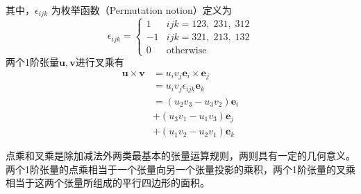 其中，$\epsilon_{ijk}$ 为枚举函数（Permutation notion）定义为
\begin{equation}
    \epsilon_{ijk} = \begin{cases}
         1 & ijk = 123,\;231,\;312 \\
        -1 & ijk = 321,\;213,\;132 \\
         0 & \mathrm{otherwise}
    \end{cases}
\end{equation}
两个1阶张量$\boldsymbol u, \boldsymbol v$进行叉乘有
\begin{equation}
    \begin{split}
        \boldsymbol u \times \boldsymbol v &= u_i v_j \boldsymbol e_i \times \boldsymbol e_j \\
                                           &= u_i v_j \epsilon_{ijk} \boldsymbol e_k \\
                                           &= (u_2 v_3 - u_3 v_2) \boldsymbol e_i \\
                                           &+ (u_3 v_1 - u_1 v_3) \boldsymbol e_j \\
                                           &+ (u_1 v_2 - u_2 v_1) \boldsymbol e_k
    \end{split}
\end{equation} \par
点乘和叉乘是除加减法外两类最基本的张量运算规则，两则具有一定的几何意义。两个1阶张量的点乘相当于一个张量向另一个张量投影的乘积，两个1阶张量的叉乘相当于这两个张量所组成的平行四边形的面积。

